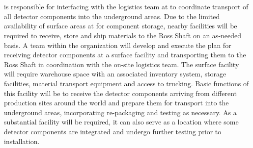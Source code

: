 \section{}
\label{sec:fdsp-coord-integ-test}

  is responsible for interfacing with the
 logistics team at \surf to coordinate transport of all
detector components into the underground areas.  Due to the limited
availability of surface areas at \surf for component storage, nearby
facilities will be required to receive, store and ship materials to
the Ross Shaft on an as-needed basis. A team within the 
organization will %
develop and execute the plan for
receiving detector components at a surface facility and transporting
them to the Ross Shaft in coordination with the on-site 
logistics team.  The surface facility will require warehouse space
with an associated inventory system, storage facilities, material
transport equipment and access to trucking.  Basic functions of this
facility will be to receive the detector components arriving from
different production sites around the world and prepare them for
transport into the underground areas, incorporating re-packaging and
testing as necessary. As a substantial facility will %
be
required, it can also serve as a location where some detector
components are integrated and undergo further testing prior to
installation.

